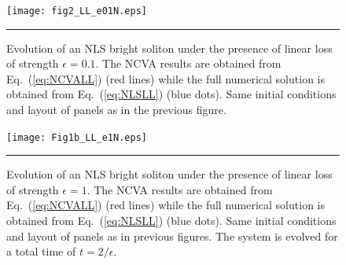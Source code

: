 \begin{figure}[htbp]
  \centering
  \centerline{\texttt{[image: fig2\_LL\_e01N.eps]}}
  \rule{35em}{0.5pt}
  \caption[NLS with Linear Loss, $\epsilon = 0.1$]{Evolution of an NLS bright soliton under the presence of linear loss of strength $\epsilon=0.1$.  The NCVA results are obtained from Eq.~(\ref{eq:NCVALL}) (red lines) while the full numerical solution is obtained from Eq.~(\ref{eq:NLSLL}) (blue dots).  Same initial conditions and layout of panels as in the previous figure.}
 \label{fig:Loss01}
\end{figure}

\begin{figure}[htbp]
  \centering
  \centerline{\texttt{[image: Fig1b\_LL\_e1N.eps]}}
  \rule{35em}{0.5pt}
  \caption[NLS with Linear Loss, $\epsilon = 1$]{Evolution of an NLS bright soliton under the presence of linear loss of strength $\epsilon=1$.  The NCVA results are obtained from Eq.~(\ref{eq:NCVALL}) (red lines) while the full numerical solution is obtained from Eq.~(\ref{eq:NLSLL}) (blue dots).  Same initial conditions and layout of panels as in previous figures.  The system is evolved for a total time of $t = 2/\epsilon$.}
   \label{fig:Loss1}
\end{figure}





